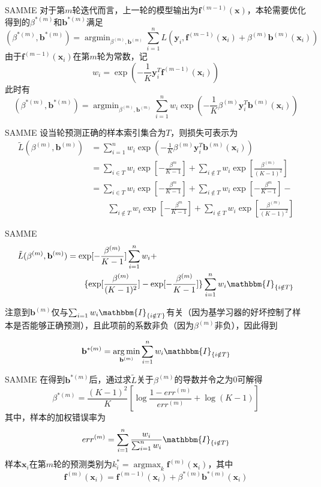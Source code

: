 \documentclass{ctexbeamer}        %
\begin{document}
\begin{frame}{SAMME}
对于第$m$轮迭代而言，上一轮的模型输出为$\mathbf{f}^{(m-1)}(\mathbf{x})$，本轮需要优化得到的$\beta^{*(m)}$和$\mathbf{b}^{*(m)}$满足
$$
(\beta^{*(m)}, \mathbf{b}^{*(m)})=\mathop{\arg\min}_{\beta^{(m)}, \mathbf{b}^{(m)}}\sum_{i=1}^n L(\mathbf{y}_i, \mathbf{f}^{(m-1)}(\mathbf{x}_i)+\beta^{(m)}\mathbf{b}^{(m)}(\mathbf{x}_i))
$$
由于$\mathbf{f}^{(m-1)}(\mathbf{x}_i)$在第$m$轮为常数，记
$$w_i=\exp(-\frac{1}{K}\mathbf{y}_i^T\mathbf{f}^{(m-1)}(\mathbf{x}_i))$$
此时有
$$
(\beta^{*(m)}, \mathbf{b}^{*(m)})=\mathop{\arg\min}_{\beta^{(m)}, \mathbf{b}^{(m)}}\sum_{i=1}^n w_i\exp(-\frac{1}{K}\beta^{(m)}\mathbf{y}_i^T\mathbf{b}^{(m)}(\mathbf{x}_i))
$$
\end{frame}
\begin{frame}{SAMME}
设当轮预测正确的样本索引集合为$T$，则损失可表示为
\begin{align*}
\tilde{L}(\beta^{(m)}, \mathbf{b}^{(m)})&=\sum_{i=1}^n w_i\exp(-\frac{1}{K}\beta^{(m)}\mathbf{y}_i^T\mathbf{b}^{(m)}(\mathbf{x}_i)) \\
&= \sum_{i\in T}w_i\exp[-\frac{\beta^{m}}{K-1}]+\sum_{i \notin T}w_i\exp[\frac{\beta^{(m)}}{(K-1)^2}] \\
&= \sum_{i\in T}w_i\exp[-\frac{\beta^{m}}{K-1}] +\sum_{i\notin T}w_i\exp[-\frac{\beta^{m}}{K-1}] - \\&\qquad \sum_{i\notin T}w_i\exp[-\frac{\beta^{m}}{K-1}] +\sum_{i \notin T}w_i\exp[\frac{\beta^{(m)}}{(K-1)^2}]
\end{align*}
\end{frame}

\begin{frame}{SAMME}
\begin{align*}
\tilde{L}(\beta^{(m)}, \mathbf{b}^{(m)})&=\exp[-\frac{\beta^{(m)}}{K-1}]\sum_{i=1}^nw_i +\\&\qquad \{ \exp[\frac{\beta^{(m)}}{(K-1)^2}]-\exp[-\frac{\beta^{(m)}}{K-1}] \}\sum_{i=1}^nw_i\mathbbm{I}_{\{i\notin T\}}
\end{align*}

注意到$\mathbf{b}^{(m)}$仅与$\sum_{i=1}w_i\mathbbm{I}_{\{i\notin T\}}$有关（因为基学习器的好坏控制了样本是否能够正确预测），且此项前的系数非负（因为$\beta^{(m)}$非负），因此得到

$$\mathbf{b}^{*(m)}=\mathop{\arg\min}_{\mathbf{b}^{(m)}}\sum_{i=1}^n w_i\mathbbm{I}_{\{i\notin T\}}$$
\end{frame}

\begin{frame}{SAMME}
在得到$\mathbf{b}^{*(m)}$后，通过求$\tilde{L}$关于$\beta^{(m)}$的导数并令之为0可解得
$$\beta^{*(m)}=\frac{(K-1)^2}{K}[\log\frac{1-err^{(m)}}{err^{(m)}}+\log(K-1)]$$
其中，样本的加权错误率为
$$err^{(m)}=\sum_{i=1}^n\frac{w_i}{\sum_{i=1}^nw_i}\mathbbm{I}_{\{i\notin T\}}$$
样本$\mathbf{x}_i$在第$m$轮的预测类别为$k_i^*=\mathop{\arg\max}_{k} \mathbf{f}^{(m)}(\mathbf{x}_i)$，其中
$$\mathbf{f}^{(m)}(\mathbf{x}_i)=\mathbf{f}^{(m-1)}(\mathbf{x}_i)+\beta^{*(m)}\mathbf{b}^{*(m)}(\mathbf{x}_i)$$
\end{frame}
\end{document}
